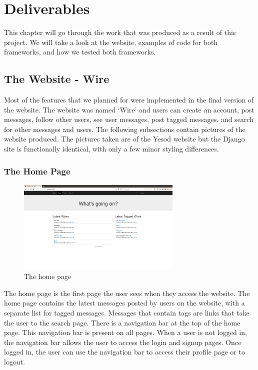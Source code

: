 \chapter{Deliverables}
\label{chap:Deliverable}

This chapter will go through the work that was produced as a result of this
project. We will take a look at the website, examples of code for both frameworks,
and how we tested both frameworks.

\section{The Website - Wire}

Most of the features that we planned for were implemented in the final version
of the website. The website was named `Wire' and users can create an account,
post messages, follow other users, see user messages, post tagged
messages, and search for other messages and users. The following subsections
contain pictures of the website produced. The pictures taken are of the Yesod
website but the Django site is functionally identical, with only a few minor styling
differences.

\subsection{The Home Page}

\begin{figure}[H]
	\centering
	\includegraphics[width=0.7\textwidth]{final_report/pics/home.png}
	\caption{The home page}
	\label{fig:wireHome}
\end{figure}

The home page is the first page the user sees when they access the website.
The home page contains the latest messages posted by users on the website,
with a separate list for tagged messages. Messages that contain tags are links
that take the user to the search page. There is a navigation bar at the top of
the home page. This navigation bar is present on all pages. When a user is not
logged in, the navigation bar allows the user to access the login and signup pages.
Once logged in, the user can use the navigation bar to access their profile page
or to logout.

